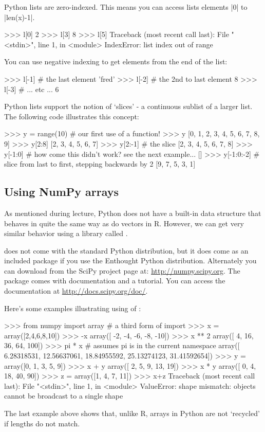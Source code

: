 Python lists are zero-indexed. This means you can access lists elements
|0| to |len(x)-1|.
%
\begin{python}
>>> l[0]
2
>>> l[3]
8
>>> l[5]
Traceback (most recent call last):
  File "<stdin>", line 1, in <module>
IndexError: list index out of range
\end{python}
%
You can use negative indexing to get elements from the end of the list:
\begin{python}
>>> l[-1] # the last element
'fred'
>>> l[-2] # the 2nd to last element
8
>>> l[-3] # ... etc ...
6
\end{python}

Python lists support the notion of `slices' - a continuous sublist of a
larger list. The following code illustrates this concept:
%
\begin{python}
>>> y = range(10)  # our first use of a function!
>>> y
[0, 1, 2, 3, 4, 5, 6, 7, 8, 9]
>>> y[2:8]
[2, 3, 4, 5, 6, 7]
>>> y[2:-1] # the slice
[2, 3, 4, 5, 6, 7, 8]
>>> y[-1:0] # how come this didn't work? see the next example...
[]
>>> y[-1:0:-2]  # slice from last to first, stepping backwards by 2
[9, 7, 5, 3, 1]
\end{python}

\subsection{Using NumPy arrays}

As mentioned during lecture, Python does not have a built-in data
structure that behaves in quite the same way as do vectors in R.
However, we can get very similar behavior using a library called \numpy.

\numpy does not come with the standard Python distribution, but it does come
as an included package if you use the Enthought Python distribution.
Alternately you can download \numpy from the SciPy project page at:
\url{http://numpy.scipy.org}. The \numpy package comes with documentation and
a tutorial. You can access the documentation at
\url{http://docs.scipy.org/doc/}.

Here's some examples illustrating using of \numpy:
\begin{python}
>>> from numpy import array # a third form of import 
>>> x = array([2,4,6,8,10])
>>> -x
array([ -2,  -4,  -6,  -8, -10])
>>> x ** 2
array([  4,  16,  36,  64, 100])
>>> pi * x # assumes pi is in the current namespace
array([  6.28318531,  12.56637061,  18.84955592,  25.13274123,  31.41592654])
>>> y = array([0, 1, 3, 5, 9])
>>> x + y
array([ 2,  5,  9, 13, 19])
>>> x * y
array([ 0,  4, 18, 40, 90])
>>> z = array([1, 4, 7, 11])
>>> x+z
Traceback (most recent call last):
  File "<stdin>", line 1, in <module>
ValueError: shape mismatch: objects cannot be broadcast to a single shape
\end{python}
%
The last example above shows that, unlike R, \numpy arrays in Python are
not `recycled' if lengths do not match.

